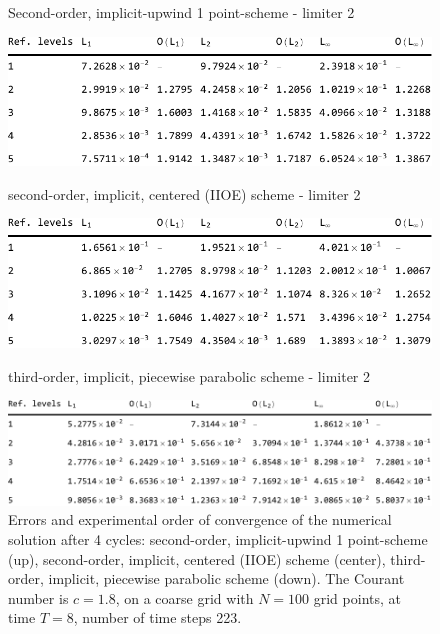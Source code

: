 \documentclass[../thesis.tex]{subfiles}
\begin{document}
\begin{figure}[H]
	\centering
    \caption*{Second-order, implicit-upwind 1 point-scheme - limiter 2}
	\includegraphics[width=\textwidth]{../tab/tab-1point-c1p8-T8-limit2-smooth.pdf}
    \caption*{second-order, implicit, centered (IIOE) scheme - limiter 2}
	\includegraphics[width=\textwidth]{../tab/tab-iioe-c1p8-T8-limit2-smooth.pdf}
    \caption*{third-order, implicit, piecewise parabolic scheme - limiter 2}
	\includegraphics[width=\textwidth]{../tab/tab-implicit-ppm-c1p8-T8-limit2-smooth.pdf}
	\caption{Errors and experimental order of convergence of the numerical solution after 4 cycles: second-order, implicit-upwind 1 point-scheme (up), second-order, implicit, centered (IIOE) scheme (center), third-order, implicit, piecewise parabolic scheme (down). The Courant number is \(c = 1.8\), on a coarse grid with \(N = 100\) grid points, at time \(T = 8\), number of time steps 223.}
	\label{tab:c1p8-T8-limit2-smooth}
\end{figure}
\end{document}
